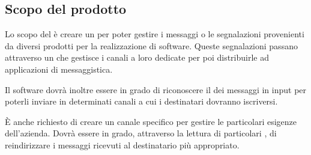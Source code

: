 \subsection{Scopo del prodotto}



Lo scopo del  è creare un  per poter gestire i messaggi o le segnalazioni provenienti da diversi prodotti per la realizzazione di software.
Queste segnalazioni passano attraverso un  che gestisce i canali a loro dedicate per poi distribuirle ad applicazioni di messaggistica.\par
Il software dovrà inoltre essere in grado di riconoscere il  dei messaggi in input per poterli inviare in determinati canali a cui i
destinatari dovranno iscriversi.\par
\`E anche richiesto di creare un canale specifico per gestire le particolari esigenze dell'azienda. Dovrà essere in grado, attraverso la lettura di
particolari	, di reindirizzare i messaggi ricevuti al destinatario più appropriato.



